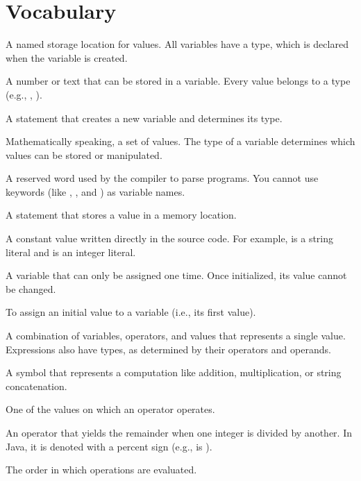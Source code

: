 \section{Vocabulary}

\begin{description}

A named storage location for values.
All variables have a type, which is declared when the variable is created.

A number or text that can be stored in a variable.
Every value belongs to a type (e.g., , ).

A statement that creates a new variable and determines its type.

Mathematically speaking, a set of values.
The type of a variable determines which values can be stored or manipulated.

A reserved word used by the compiler to parse programs.
You cannot use keywords (like , , and ) as variable names.

A statement that stores a value in a memory location.

A constant value written directly in the source code.
For example,  is a string literal and  is an integer literal.

A variable that can only be assigned one time.
Once initialized, its value cannot be changed.

To assign an initial value to a variable (i.e., its first value).

A combination of variables, operators, and values that represents a single value.
Expressions also have types, as determined by their operators and operands.

A symbol that represents a computation like addition, multiplication, or string concatenation.

One of the values on which an operator operates.

An operator that yields the remainder when one integer is divided by another.
In Java, it is denoted with a percent sign (e.g.,  is ).

The order in which operations are evaluated.


\end{description}
